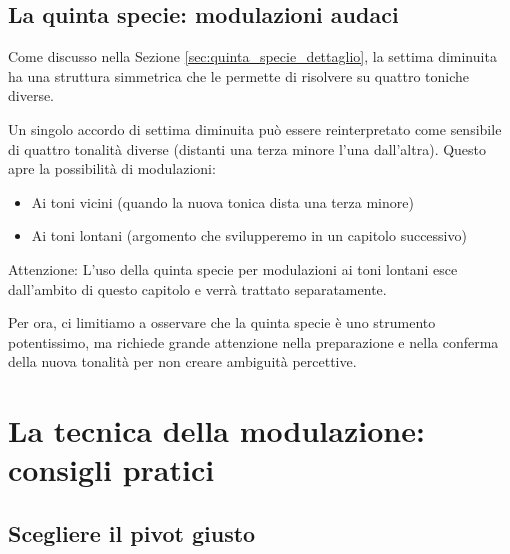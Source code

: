 \begin{esempio}[Modulazione Do M $\rightarrow$ Fa M tramite II$^7$ = VI$^7$]
	\label{ex:mod_terza_specie}
	
\end{esempio}

\subsection{La quinta specie: modulazioni audaci}
\label{subsec:quinta_specie_modulazione}

Come discusso nella Sezione \ref{sec:quinta_specie_dettaglio}, la settima diminuita ha una struttura simmetrica che le permette di risolvere su quattro toniche diverse.

\begin{regola}
	\label{reg:quinta_specie_modulazioni}
	Un singolo accordo di settima diminuita può essere reinterpretato come sensibile di quattro tonalità diverse (distanti una terza minore l'una dall'altra). Questo apre la possibilità di modulazioni:
	
	\begin{itemize}
		\item Ai toni vicini (quando la nuova tonica dista una terza minore)
		\item Ai toni lontani (argomento che svilupperemo in un capitolo successivo)
	\end{itemize}
	
	Attenzione: L'uso della quinta specie per modulazioni ai toni lontani esce dall'ambito di questo capitolo e verrà trattato separatamente.
\end{regola}

Per ora, ci limitiamo a osservare che la quinta specie è uno strumento potentissimo, ma richiede grande attenzione nella preparazione e nella conferma della nuova tonalità per non creare ambiguità percettive.

\section{La tecnica della modulazione: consigli pratici}
\label{sec:tecnica_modulazione}

\subsection{Scegliere il pivot giusto}
\label{subsec:scelta_pivot}

